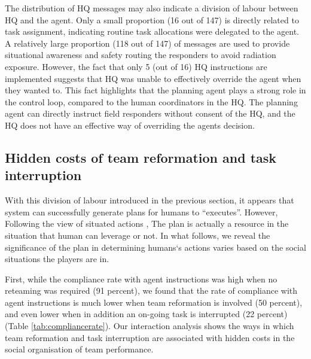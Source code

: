 The distribution of HQ messages may also indicate a division of labour between HQ and the agent. Only a small proportion (16 out of 147) is directly related to task assignment, indicating routine task allocations were delegated to the agent. A relatively large proportion (118 out of 147) of messages are used to provide situational awareness and safety routing the responders to avoid radiation exposure. However, the fact that only 5 (out of 16) HQ instructions are implemented suggests that HQ was unable to effectively override the agent when they wanted to. This fact highlights that the planning agent plays a strong role in the control loop, compared to the human coordinators in the HQ. The planning agent can directly instruct field responders without consent of the HQ, and the HQ does not have an effective way of overriding the agents decision. \\

\subsection{Hidden costs of team reformation and task interruption}\label{sec:study2social}
With this division of labour introduced in the previous section, it appears that system can successfully generate plans for humans to ``executes''. However, Following the view of situated actions \citep{Suchman1987}, The plan is actually a resource in the situation that human can leverage or not. In what follows, we reveal the significance of the plan in determining humans`s actions varies based on the social situations the players are in. 

First, while the compliance rate with agent instructions was high when no reteaming was required (91 percent), we found that the rate of compliance with agent instructions is much lower when team reformation is involved (50 percent), and even lower when in addition an on-going task is interrupted (22 percent) (Table \ref{tab:compliancerate}). Our interaction analysis shows the ways in which team reformation and task interruption are associated with hidden costs in the social organisation of team performance.  \\

